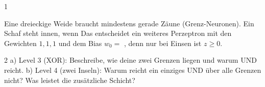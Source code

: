 \documentclass[11pt]{article}
\begin{document}

\begin{aufgabe}{1}
\begin{lueckentext}
Eine dreieckige Weide braucht mindestens  gerade Zäune (Grenz-Neuronen). Ein Schaf steht innen, wenn 
Das entscheidet ein weiteres Perzeptron mit den Gewichten $1, 1, 1$ und dem Bias $w_0 = $ , denn nur bei  Einsen ist $z \ge 0$.
\end{lueckentext}
\end{aufgabe}

\begin{aufgabe}{2}
a) Level 3 (XOR): Beschreibe, wie deine zwei Grenzen liegen und warum UND reicht.
b) Level 4 (zwei Inseln): Warum reicht ein einziges UND über alle Grenzen nicht? Was leistet die zusätzliche Schicht?
\end{aufgabe}
\end{document}
